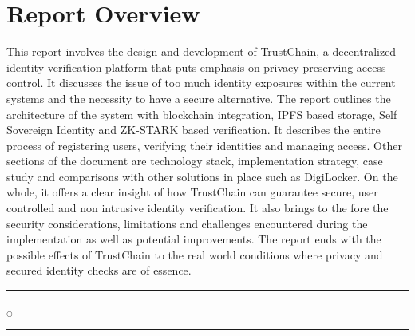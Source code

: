\section{Report Overview}
This report involves the design and development of TrustChain, a decentralized identity verification platform that puts emphasis on privacy preserving access control. It discusses the issue of too much identity exposures within the current systems and the necessity to have a secure alternative. The report outlines the architecture of the system with blockchain integration, IPFS based storage, Self Sovereign Identity and ZK-STARK based verification. It describes the entire process of registering users, verifying their identities and managing access. Other sections of the document are technology stack, implementation strategy, case study and comparisons with other solutions in place such as DigiLocker. On the whole, it offers a clear insight of how TrustChain can guarantee secure, user controlled and non intrusive identity verification. It also brings to the fore the security considerations, limitations and challenges encountered during the implementation as well as potential improvements. The report ends with the possible effects of TrustChain to the real world conditions where privacy and secured identity checks are of essence.

\rule{0.49\textwidth}{0.75pt} $_{\bigcirc}$ \rule{0.49\textwidth}{0.75pt}\\
